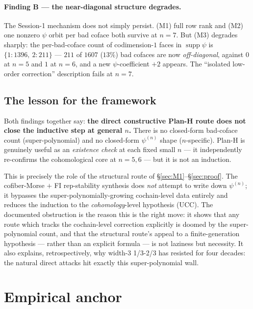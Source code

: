 \documentclass[11pt,reqno]{amsart}
\theoremstyle{plain}
\theoremstyle{definition}
\newcommand{\UCC}{\textup{(UCC)}}
\begin{document}
\paragraph{Finding B --- the near-diagonal structure degrades.}
The Session-1 mechanism does not simply persist. (M1) full row rank and
(M2) one nonzero $\psi$ orbit per bad coface both survive at $n=7$. But
(M3) degrades sharply: the per-bad-coface count of codimension-$1$ faces
in $\operatorname{supp}\psi$ is $\{1:1396,\ 2:211\}$ --- $211$ of $1607$
($13\%$) bad cofaces are now \emph{off-diagonal}, against $0$ at $n=5$
and $1$ at $n=6$, and a new $\psi$-coefficient $+2$ appears. The
``isolated low-order correction'' description fails at $n=7$.

\subsection{The lesson for the framework}\label{ssec:8.4}
Both findings together say: \textbf{the direct constructive Plan-H
route does not close the inductive step at general $n$.} There is no
closed-form bad-coface count (super-polynomial) and no closed-form
$\psi^{(n)}$ shape ($n$-specific). Plan-H is genuinely useful as an
\emph{existence check} at each fixed small $n$ --- it independently
re-confirms the cohomological core at $n=5,6$ --- but it is not an
induction.

This is precisely the role of the structural route of
\S\ref{sec:M1}--\S\ref{sec:proof}. The cofiber-Morse $+$ FI
rep-stability synthesis does \emph{not} attempt to write down
$\psi^{(n)}$; it bypasses the super-polynomially-growing cochain-level
data entirely and reduces the induction to the \emph{cohomology}-level
hypothesis \UCC. The documented obstruction is the reason this is the
right move: it shows that any route which tracks the cochain-level
correction explicitly is doomed by the super-polynomial count, and that
the structural route's appeal to a finite-generation hypothesis ---
rather than an explicit formula --- is not laziness but necessity. It
also explains, retrospectively, why width-3 1/3-2/3 has resisted for
four decades: the natural direct attacks hit exactly this
super-polynomial wall.

\section{Empirical anchor}\label{sec:empirical}
\end{document}
